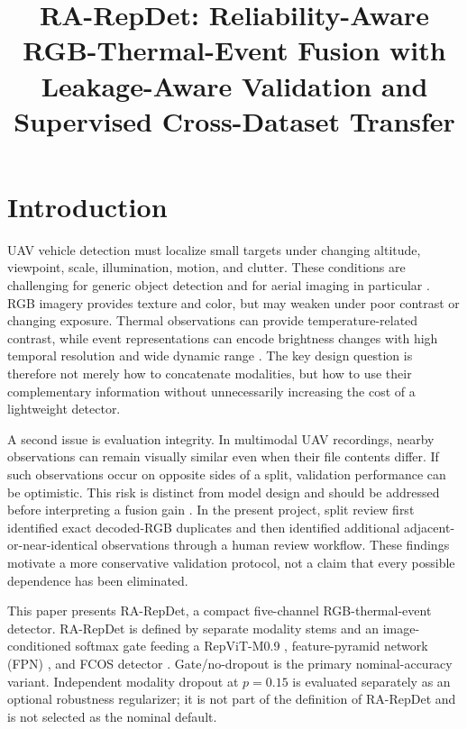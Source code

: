\documentclass[pdflatex,sn-basic,Numbered,iicol]{sn-jnl}
\title[RA-RepDet for tri-modal UAV detection]{RA-RepDet: Reliability-Aware RGB-Thermal-Event Fusion with Leakage-Aware Validation and Supervised Cross-Dataset Transfer}
\author[1]{\fnm{Nan} \sur{Xin}}
\author*[1]{\fnm{Xueting} \sur{Jin}}\email{jinxueting@ahpc.edu.cn}
\affil*[1]{\orgname{Anhui Police College}, \orgaddress{\city{Hefei}, \state{Anhui}, \country{China}}}
\begin{document}
\raggedbottom
\maketitle

\section{Introduction}
UAV vehicle detection must localize small targets under changing altitude, viewpoint, scale, illumination, motion, and clutter. These conditions are challenging for generic object detection and for aerial imaging in particular \cite{zhao2019object,cheng2016survey,xia2022dota,zhu2017deepRS}. RGB imagery provides texture and color, but may weaken under poor contrast or changing exposure. Thermal observations can provide temperature-related contrast, while event representations can encode brightness changes with high temporal resolution and wide dynamic range \cite{baltrusaitis2019multimodal,gallego2022event}. The key design question is therefore not merely how to concatenate modalities, but how to use their complementary information without unnecessarily increasing the cost of a lightweight detector.

A second issue is evaluation integrity. In multimodal UAV recordings, nearby observations can remain visually similar even when their file contents differ. If such observations occur on opposite sides of a split, validation performance can be optimistic. This risk is distinct from model design and should be addressed before interpreting a fusion gain \cite{kapoor2023leakage,cawley2010overfitting}. In the present project, split review first identified exact decoded-RGB duplicates and then identified additional adjacent-or-near-identical observations through a human review workflow. These findings motivate a more conservative validation protocol, not a claim that every possible dependence has been eliminated.

This paper presents RA-RepDet, a compact five-channel RGB-thermal-event detector. RA-RepDet is defined by separate modality stems and an image-conditioned softmax gate feeding a RepViT-M0.9 \cite{wang2024repvit}, feature-pyramid network (FPN) \cite{lin2017fpn}, and FCOS detector \cite{tian2019fcos}. Gate/no-dropout is the primary nominal-accuracy variant. Independent modality dropout at $p=0.15$ is evaluated separately as an optional robustness regularizer; it is not part of the definition of RA-RepDet and is not selected as the nominal default.
\end{document}
